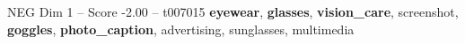 \begin{textsample}{NEG Dim 1 – Score -2.00 – t007015}  \label{ex:f1_neg_011}
\textbf{eyewear}, \textbf{glasses}, \textbf{vision\_care}, screenshot, \textbf{goggles}, \textbf{photo\_caption}, advertising, sunglasses, multimedia

\end{textsample}
